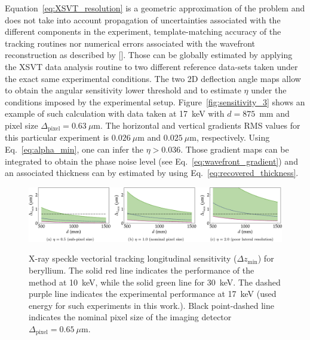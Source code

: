 \begin{refsection}
Equation~\ref{eq:XSVT_resolution} is a geometric approximation of the problem and does not take into account propagation of uncertainties associated with the different components in the experiment, template-matching accuracy of the tracking routines nor numerical errors associated with the wavefront reconstruction as described by [\cite{Fried1977, Southwell1980}]. Those can be globally estimated by applying the XSVT data analysis routine to two different reference data-sets taken under the exact same experimental conditions. The two 2D deflection angle maps allow to obtain the angular sensitivity lower threshold and to estimate $\eta$ under the conditions imposed by the experimental setup. Figure~\ref{fig:sensitivity_3} shows an example of such calculation with data taken at 17~keV with $d=875$~mm and pixel size $\Delta_\text{pixel}= 0.63~\mu$m. The horizontal and vertical gradients RMS values for this particular experiment is $0.026~\mu$m and $0.025~\mu$m, respectively. Using Eq.~\ref{eq:alpha_min}, one can infer the $\eta>0.036$. Those gradient maps can be integrated to obtain the phase noise level (see Eq.~\ref{eq:wavefront_gradient}) and an associated thickness can by estimated by using Eq.~\ref{eq:recovered_thickness}.

\begin{figure}[t]
        \centering
        {\includegraphics[width=1.0\linewidth]{figures/ch04b/sensitivity_2b.pdf}}
        \caption[XSVT sensitivity calculation]{X-ray speckle vectorial tracking longitudinal sensitivity ($\Delta{z_{\text{min}}}$) for beryllium. The solid red line indicates the performance of the method at 10~keV, while the solid green line for 30~keV. The dashed purple line indicates the experimental performance at 17~keV (used energy for such experiments in this work.). Black point-dashed line indicates the nominal pixel size of the imaging detector $\Delta_\text{pixel}=0.65~\mu$m.}\label{fig:sensitivity_2}
\end{figure}


\end{refsection}
